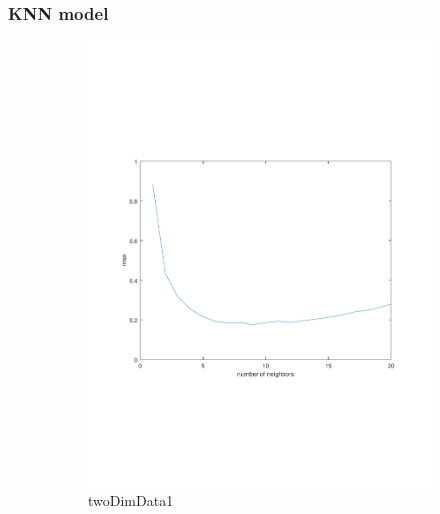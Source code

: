 \documentclass[]{article}
\begin{document}
\subsubsection{KNN model}

\begin{figure}[ht]
\centering
\begin{subfigure}{.49\textwidth}
	\centering
	\includegraphics[trim= 10cm 5cm 10cm 5cm, scale=0.4]{proj1-4_1e-mse-data1}
	\caption{twoDimData1}
	\label{fig:proj1-4_1e-mse-data1}
\end{subfigure}
\begin{subfigure}{.49\textwidth}
	\centering

\end{subfigure}
\end{figure}
\end{document}
